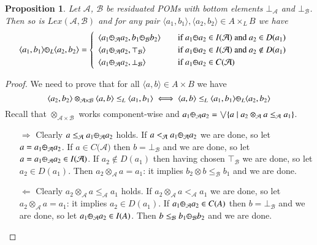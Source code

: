 \documentclass[a4paper]{elsarticle}
\newtheorem{proposition}{Proposition}
\newcommand{\1}{\mathbf{1}}
\def\odiv{{ \ominus\hspace{-8pt}:}\;}
\begin{document}
\begin{proposition}\label{def:resBI}
Let $\mathcal{A}$, $\mathcal{B}$ be residuated POMs with bottom elements $\bot_\mathcal{A}$ and $\bot_\mathcal{B}$.
%
Then so is $Lex(\mathcal{A}, \mathcal{B})$ and for any pair $\langle a_1, b_1\rangle, \langle a_2, b_2\rangle \in A \times_L B$
we have 
\[
	\langle a_1, b_1\rangle \odiv_L \langle a_2, b_2\rangle = 	\begin{cases}
	\begin{array}{lcl}
	\langle a_1 \odiv_\mathcal{A} a_2, b_1  \odiv_\mathcal{B} b_2\rangle 
	& & \mbox{if  }  a_1 \odiv a_2 \in I(\mathcal{A}) \mbox{ and } a_2 \in D(a_1)\\
	\langle a_1 \odiv_\mathcal{A} a_2, \top_\mathcal{B} \rangle 
	& & \mbox{if  } a_1 \odiv a_2 \in I(\mathcal{A}) \mbox{ and } a_2 \not \in D(a_1) \\
	\langle a_1 \odiv_\mathcal{A} a_2, \bot_\mathcal{B} \rangle 
	& & \mbox{if  }  a_1 \odiv a_2 \in C(\mathcal{A}) 
	\end{array}
	\end{cases}
\]
\end{proposition}
\begin{proof}
We need to prove that for all $\langle a, b\rangle \in A\times B$ we have
$$\langle a_2, b_2\rangle \otimes_{\mathcal{A} \times \mathcal{B}} \langle a, b\rangle \leq_L \langle a_1, b_1\rangle
\iff \langle a, b\rangle \leq_L  \langle a_1, b_1\rangle \odiv_L \langle a_2, b_2\rangle$$
%
Recall that $\otimes_{\mathcal{A} \times \mathcal{B}}$ works component-wise and 
$a_1 \odiv_\mathcal{A} a_2 = \bigvee \{a \mid a_2 \otimes_\mathcal{A} a \leq_\mathcal{A} a_1\}$.

\begin{itemize}
\item[$\Rightarrow$] Clearly $a \leq_\mathcal{A} a_1 \odiv_\mathcal{A} a_2$ holds.
If $a <_\mathcal{A} a_1 \odiv_\mathcal{A} a_2$ we are done, so let 
$a = a_1 \odiv_\mathcal{A} a_2$. If $a \in C(\mathcal{A)}$ then 
$b = \bot_\mathcal{B}$ and we are done, so let $a = a_1 \odiv_\mathcal{A} a_2 \in I(\mathcal{A)}$.
If $a_2 \not \in D(a_1)$ then having chosen $\top_\mathcal{B}$ we are done, so let $a_2 \in D(a_1)$.
Then $a_2 \otimes_\mathcal{A} a = a_1$: it implies $b_2 \otimes b \leq_\mathcal{B} b_1$
and we are done.

\item[$\Leftarrow$]
Clearly $a_2 \otimes_\mathcal{A} a \leq_\mathcal{A} a_1$ holds.
If $a_2 \otimes_\mathcal{A} a <_\mathcal{A} a_1$ we are done, so let 
$a_2 \otimes_\mathcal{A} a = a_1$: it implies $a_2 \in D(a_1)$.
If $a_1 \odiv_\mathcal{A} a_2 \in C(A)$ then $b = \bot_\mathcal{B}$ and we are done, so let
$a_1 \odiv_\mathcal{A} a_2 \in I(A)$. Then $b\leq_\mathcal{B} b_1 \odiv_\mathcal{B} b_2$
and we are done.
\end{itemize}
\end{proof}
\end{document}
